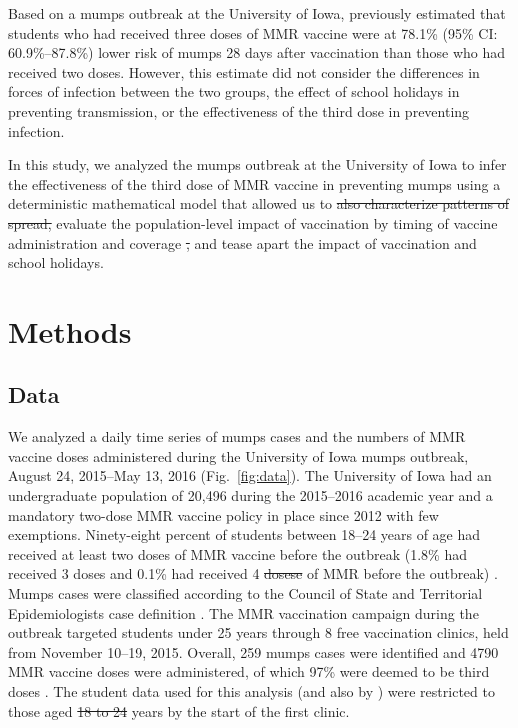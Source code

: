 \documentclass[12pt]{article}
\newcommand{\fref}[1]{Fig.~\ref{fig:#1}}
\providecommand{\DIFaddtex}[1]{{\protect\color{blue}\uwave{#1}}} %
\providecommand{\DIFdeltex}[1]{{\protect\color{red}\sout{#1}}}                      %
\providecommand{\DIFaddbegin}{} %
\providecommand{\DIFaddend}{} %
\providecommand{\DIFdelbegin}{} %
\providecommand{\DIFdelend}{} %
\providecommand{\DIFadd}[1]{\texorpdfstring{\DIFaddtex{#1}}{#1}} %
\providecommand{\DIFdel}[1]{\texorpdfstring{\DIFdeltex{#1}}{}} %
\newcommand{\DIFscaledelfig}{0.5}
\newlength{\DIFdelgraphicswidth} %
\newlength{\DIFdelgraphicsheight} %
\newcommand{\DIFaddincludegraphics}[2][]{{\color{blue}\fbox{\DIFOincludegraphics[#1]{#2}}}} %
\newcommand{\DIFdelincludegraphics}[2][]{%
\sbox{\DIFdelgraphicsbox}{\DIFOincludegraphics[#1]{#2}}%
\settoboxwidth{\DIFdelgraphicswidth}{\DIFdelgraphicsbox} %
\settoboxtotalheight{\DIFdelgraphicsheight}{\DIFdelgraphicsbox} %
\scalebox{\DIFscaledelfig}{%
\parbox[b]{\DIFdelgraphicswidth}{\usebox{\DIFdelgraphicsbox}\\[-\baselineskip] \rule{\DIFdelgraphicswidth}{0em}}\llap{\resizebox{\DIFdelgraphicswidth}{\DIFdelgraphicsheight}{%
\setlength{\unitlength}{\DIFdelgraphicswidth}%
\begin{picture}(1,1)%
\thicklines\linethickness{2pt} %
{\color[rgb]{1,0,0}\put(0,0){\framebox(1,1){}}}%
{\color[rgb]{1,0,0}\put(0,0){\line( 1,1){1}}}%
{\color[rgb]{1,0,0}\put(0,1){\line(1,-1){1}}}%
\end{picture}%
}\hspace*{3pt}}} %
} %
\DeclareRobustCommand{\DIFaddbegin}{\DIFOaddbegin \let\includegraphics\DIFaddincludegraphics} %
\DeclareRobustCommand{\DIFaddend}{\DIFOaddend \let\includegraphics\DIFOincludegraphics} %
\DeclareRobustCommand{\DIFdelbegin}{\DIFOdelbegin \let\includegraphics\DIFdelincludegraphics} %
\DeclareRobustCommand{\DIFdelend}{\DIFOaddend \let\includegraphics\DIFOincludegraphics} %
\begin{document}
Based on a mumps outbreak at the University of Iowa, \cite{cardemil2017effectiveness} previously estimated that students who had received three doses of MMR vaccine were at 78.1\% (95\% CI: 60.9\%--87.8\%) lower risk of mumps \DIFaddbegin \DIFadd{disease }\DIFaddend 28 days after vaccination than those who had received two doses.
However, this estimate did not consider the differences in forces of infection between the two groups, the effect of school holidays in preventing transmission, or the effectiveness of the third dose in preventing infection. 

In this study, we analyzed the mumps outbreak at the University of Iowa to infer the effectiveness of the third dose of MMR vaccine in preventing mumps using a deterministic mathematical model that allowed us to \DIFdelbegin \DIFdel{also characterize patterns of spread, }\DIFdelend evaluate the population-level impact of vaccination by timing of vaccine administration and coverage \DIFdelbegin \DIFdel{, }\DIFdelend and tease apart the impact of vaccination and school holidays.

\section{Methods}

\subsection{Data}

We analyzed a daily time series of mumps cases and the numbers of MMR vaccine doses administered during the University of Iowa mumps outbreak, August 24, 2015--May 13, 2016 (\fref{data}).
The University of Iowa had an undergraduate population of 20,496 during the 2015--2016 academic year and a mandatory two-dose MMR vaccine policy in place since 2012 with few exemptions.
Ninety-eight percent of students between 18--24 years of age had received at least two doses of MMR vaccine before the outbreak (1.8\% had received 3 doses and 0.1\% had received 4 \DIFdelbegin \DIFdel{dosese }\DIFdelend \DIFaddbegin \DIFadd{doses }\DIFaddend of MMR before the outbreak) \citep{cardemil2017effectiveness}.
Mumps cases were classified according to the Council of State and Territorial Epidemiologists case definition \citep{casedef}. 
The MMR vaccination campaign during the outbreak targeted students under 25 years through 8 free vaccination clinics, held from November 10--19, 2015. 
Overall, 259 mumps cases were identified and 4790 MMR vaccine doses were administered, of which 97\% were deemed to be third doses \citep{cardemil2017effectiveness}.
The student data used for this analysis (and also by \cite{cardemil2017effectiveness}) were restricted to those aged \DIFdelbegin \DIFdel{18 to 24 }\DIFdelend \DIFaddbegin \DIFadd{18---24 }\DIFaddend years by the start of the first clinic. 
\end{document}
